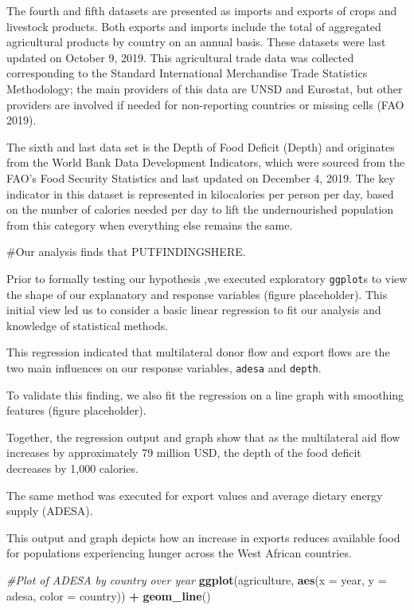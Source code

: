 \documentclass[
]{article}
\newenvironment{Shaded}{\begin{snugshade}}{\end{snugshade}}
\newcommand{\CommentTok}[1]{\textcolor[rgb]{0.56,0.35,0.01}{\textit{#1}}}
\newcommand{\DataTypeTok}[1]{\textcolor[rgb]{0.13,0.29,0.53}{#1}}
\newcommand{\KeywordTok}[1]{\textcolor[rgb]{0.13,0.29,0.53}{\textbf{#1}}}
\newcommand{\NormalTok}[1]{#1}
\newcommand{\OperatorTok}[1]{\textcolor[rgb]{0.81,0.36,0.00}{\textbf{#1}}}
\newcommand{\StringTok}[1]{\textcolor[rgb]{0.31,0.60,0.02}{#1}}
\begin{document}
The fourth and fifth datasets are presented as imports and exports of
crops and livestock products. Both exports and imports include the total
of aggregated agricultural products by country on an annual basis. These
datasets were last updated on October 9, 2019. This agricultural trade
data was collected corresponding to the Standard International
Merchandise Trade Statistics Methodology; the main providers of this
data are UNSD and Eurostat, but other providers are involved if needed
for non-reporting countries or missing cells (FAO 2019).

The sixth and last data set is the Depth of Food Deficit (Depth) and
originates from the World Bank Data Development Indicators, which were
sourced from the FAO's Food Security Statistics and last updated on
December 4, 2019. The key indicator in this dataset is represented in
kilocalories per person per day, based on the number of calories needed
per day to lift the undernourished population from this category when
everything else remains the same.

\#Our analysis finds that PUTFINDINGSHERE.

Prior to formally testing our hypothesis ,we executed exploratory
\texttt{ggplot}s to view the shape of our explanatory and response
variables (figure placeholder). This initial view led us to consider a
basic linear regression to fit our analysis and knowledge of statistical
methods.

This regression indicated that multilateral donor flow and export flows
are the two main influences on our response variables, \texttt{adesa}
and \texttt{depth}.

To validate this finding, we also fit the regression on a line graph
with smoothing features (figure placeholder).

Together, the regression output and graph show that as the multilateral
aid flow increases by approximately 79 million USD, the depth of the
food deficit decreases by 1,000 calories.

The same method was executed for export values and average dietary
energy supply (ADESA).

This output and graph depicts how an increase in exports reduces
available food for populations experiencing hunger across the West
African countries.

\begin{Shaded}
\begin{Highlighting}[]
\CommentTok{#Plot of ADESA by country over year}
\KeywordTok{ggplot}\NormalTok{(agriculture, }\KeywordTok{aes}\NormalTok{(}\DataTypeTok{x =}\NormalTok{ year, }\DataTypeTok{y =}\NormalTok{ adesa, }\DataTypeTok{color =}\NormalTok{ country)) }\OperatorTok{+}\StringTok{ }\KeywordTok{geom_line}\NormalTok{()}
\end{Highlighting}
\end{Shaded}
\end{document}
